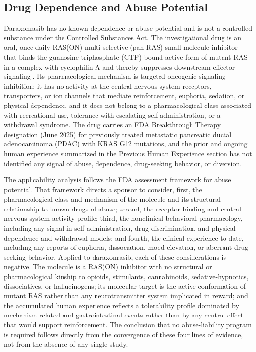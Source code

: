 \subsection{Drug Dependence and Abuse Potential}

Daraxonrasib has no known dependence or abuse potential and is not a controlled
substance under the Controlled Substances Act. The investigational drug is an oral,
once-daily RAS(ON) multi-selective (pan-RAS) small-molecule inhibitor that binds
the guanosine triphosphate (GTP) bound active form of mutant RAS in a complex with
cyclophilin A and thereby suppresses downstream effector signaling
\cite{daraxwhipple,onpremwhippl}. Its pharmacological mechanism is targeted
oncogenic-signaling inhibition; it has no activity at the central nervous system
receptors, transporters, or ion channels that mediate reinforcement, euphoria,
sedation, or physical dependence, and it does not belong to a pharmacological class
associated with recreational use, tolerance with escalating self-administration, or
a withdrawal syndrome. The drug carries an FDA Breakthrough Therapy designation
(June 2025) for previously treated metastatic pancreatic ductal adenocarcinoma
(PDAC) with KRAS G12 mutations, and the prior and ongoing human experience
summarized in the Previous Human Experience section has not identified any signal
of abuse, dependence, drug-seeking behavior, or diversion.

The applicability analysis follows the FDA assessment framework for abuse potential.
That framework directs a sponsor to consider, first, the pharmacological class and
mechanism of the molecule and its structural relationship to known drugs of abuse;
second, the receptor-binding and central-nervous-system activity profile; third,
the nonclinical behavioral pharmacology, including any signal in self-administration,
drug-discrimination, and physical-dependence and withdrawal models; and fourth, the
clinical experience to date, including any reports of euphoria, dissociation, mood
elevation, or aberrant drug-seeking behavior. Applied to daraxonrasib, each of these
considerations is negative. The molecule is a RAS(ON) inhibitor with no structural
or pharmacological kinship to opioids, stimulants, cannabinoids, sedative-hypnotics,
dissociatives, or hallucinogens; its molecular target is the active conformation of
mutant RAS rather than any neurotransmitter system implicated in reward; and the
accumulated human experience reflects a tolerability profile dominated by
mechanism-related and gastrointestinal events rather than by any central effect that
would support reinforcement. The conclusion that no abuse-liability program is
required follows directly from the convergence of these four lines of evidence, not
from the absence of any single study.

